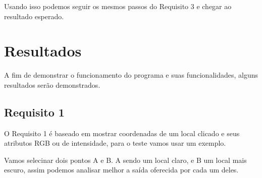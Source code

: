 \documentclass{bmvc2k}
\begin{document}
Usando isso podemos seguir os mesmos passos do Requisito 3 e chegar ao resultado esperado.

\section{Resultados}

A fim de demonstrar o funcionamento do programa e suas funcionalidades, 
alguns resultados serão demonstrados.

\subsection{Requisito 1}

O Requisito 1 é baseado em mostrar coordenadas de um local clicado e seus
atributos RGB ou de intensidade, para o teste vamos usar um exemplo.

Vamos selecinar dois pontos A e B. A sendo um local claro, e B um local mais escuro, assim
podemos analisar melhor a saída oferecida por cada um deles.

\pagebreak
\end{document}
